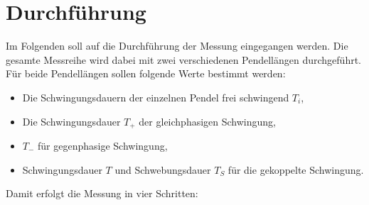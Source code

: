 \section{Durchführung}
\label{sec:Durchführung}
Im Folgenden soll auf die Durchführung der Messung eingegangen werden. Die gesamte
Messreihe wird dabei mit zwei verschiedenen Pendellängen durchgeführt. Für beide
Pendellängen sollen folgende Werte bestimmt werden:
\begin{itemize}
	\item Die Schwingungsdauern der einzelnen Pendel frei schwingend $T_i$,
	\item Die Schwingungsdauer $T_+$ der gleichphasigen Schwingung,
	\item $T_-$ für gegenphasige Schwingung,
	\item Schwingungsdauer $T$ und Schwebungsdauer $T_S$ für die gekoppelte
		Schwingung.
\end{itemize}
Damit erfolgt die Messung in vier Schritten:
